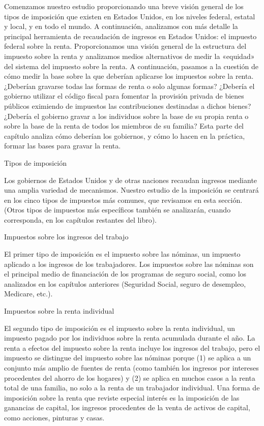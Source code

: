 \documentclass[10pt,a4paper]{article}
\begin{document}
{Comenzamos nuestro estudio proporcionando una breve visión general de los tipos de imposición que existen en Estados Unidos, en los niveles federal, estatal y local, y en todo el mundo. A continuación, analizamos con más detalle la principal herramienta de recaudación de ingresos en Estados Unidos: el impuesto federal sobre la renta. Proporcionamos una visión general de la estructura del impuesto sobre la renta y analizamos medios alternativos de medir la «equidad» del sistema del impuesto sobre la renta. A continuación, pasamos a la cuestión de cómo medir la base sobre la que deberían aplicarse los impuestos sobre la renta. ¿Deberían gravarse todas las formas de renta o solo algunas formas? ¿Debería el gobierno utilizar el código fiscal para fomentar la provisión privada de bienes públicos eximiendo de impuestos las contribuciones destinadas a dichos bienes? ¿Debería el gobierno gravar a los individuos sobre la base de su propia renta o sobre la base de la renta de todos los miembros de su familia? Esta parte del capítulo analiza cómo deberían los gobiernos, y cómo lo hacen en la práctica, formar las bases para gravar la renta.


Tipos de imposición

Los gobiernos de Estados Unidos y de otras naciones recaudan ingresos mediante una amplia variedad de mecanismos. Nuestro estudio de la imposición se centrará en los cinco tipos de impuestos más comunes, que revisamos en esta sección. (Otros tipos de impuestos más específicos también se analizarán, cuando corresponda, en los capítulos restantes del libro).

Impuestos sobre los ingresos del trabajo

El primer tipo de imposición es el impuesto sobre las nóminas, un impuesto aplicado a los ingresos de los trabajadores. Los impuestos sobre las nóminas son el principal medio de financiación de los programas de seguro social, como los analizados en los capítulos anteriores (Seguridad Social, seguro de desempleo, Medicare, etc.).

Impuestos sobre la renta individual

El segundo tipo de imposición es el impuesto sobre la renta individual, un impuesto pagado por los individuos sobre la renta acumulada durante el año. La renta a efectos del impuesto sobre la renta incluye los ingresos del trabajo, pero el impuesto se distingue del impuesto sobre las nóminas porque (1) se aplica a un conjunto más amplio de fuentes de renta (como también los ingresos por intereses procedentes del ahorro de los hogares) y (2) se aplica en muchos casos a la renta total de una familia, no solo a la renta de un trabajador individual. Una forma de imposición sobre la renta que reviste especial interés es la imposición de las ganancias de capital, los ingresos procedentes de la venta de activos de capital, como acciones, pinturas y casas.

}
\end{document}

